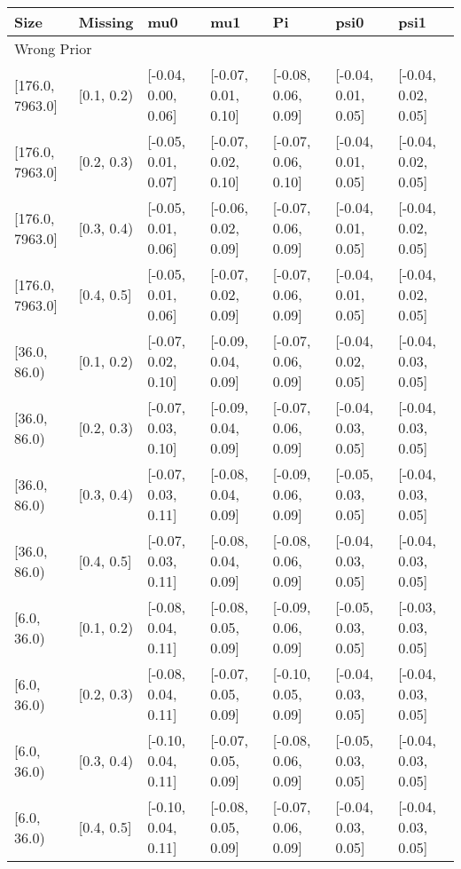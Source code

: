 \begin{table}[ht]
\centering
\begin{tabular}{lllllll}
  \toprule
Size & Missing & mu0 & mu1 & Pi & psi0 & psi1 \\ 
  \midrule
\multicolumn{7}{l}{Wrong Prior}\\
{[176.0, 7963.0]} & {[0.1, 0.2)} & {[-0.04, 0.00, 0.06]} & {[-0.07, 0.01, 0.10]} & {[-0.08, 0.06, 0.09]} & {[-0.04, 0.01, 0.05]} & {[-0.04, 0.02, 0.05]} \\ 
  {[176.0, 7963.0]} & {[0.2, 0.3)} & {[-0.05, 0.01, 0.07]} & {[-0.07, 0.02, 0.10]} & {[-0.07, 0.06, 0.10]} & {[-0.04, 0.01, 0.05]} & {[-0.04, 0.02, 0.05]} \\ 
  {[176.0, 7963.0]} & {[0.3, 0.4)} & {[-0.05, 0.01, 0.06]} & {[-0.06, 0.02, 0.09]} & {[-0.07, 0.06, 0.09]} & {[-0.04, 0.01, 0.05]} & {[-0.04, 0.02, 0.05]} \\ 
  {[176.0, 7963.0]} & {[0.4, 0.5]} & {[-0.05, 0.01, 0.06]} & {[-0.07, 0.02, 0.09]} & {[-0.07, 0.06, 0.09]} & {[-0.04, 0.01, 0.05]} & {[-0.04, 0.02, 0.05]} \\ 
  {[36.0, 86.0)} & {[0.1, 0.2)} & {[-0.07, 0.02, 0.10]} & {[-0.09, 0.04, 0.09]} & {[-0.07, 0.06, 0.09]} & {[-0.04, 0.02, 0.05]} & {[-0.04, 0.03, 0.05]} \\ 
  {[36.0, 86.0)} & {[0.2, 0.3)} & {[-0.07, 0.03, 0.10]} & {[-0.09, 0.04, 0.09]} & {[-0.07, 0.06, 0.09]} & {[-0.04, 0.03, 0.05]} & {[-0.04, 0.03, 0.05]} \\ 
  {[36.0, 86.0)} & {[0.3, 0.4)} & {[-0.07, 0.03, 0.11]} & {[-0.08, 0.04, 0.09]} & {[-0.09, 0.06, 0.09]} & {[-0.05, 0.03, 0.05]} & {[-0.04, 0.03, 0.05]} \\ 
  {[36.0, 86.0)} & {[0.4, 0.5]} & {[-0.07, 0.03, 0.11]} & {[-0.08, 0.04, 0.09]} & {[-0.08, 0.06, 0.09]} & {[-0.04, 0.03, 0.05]} & {[-0.04, 0.03, 0.05]} \\ 
  {[6.0, 36.0)} & {[0.1, 0.2)} & {[-0.08, 0.04, 0.11]} & {[-0.08, 0.05, 0.09]} & {[-0.09, 0.06, 0.09]} & {[-0.05, 0.03, 0.05]} & {[-0.03, 0.03, 0.05]} \\ 
  {[6.0, 36.0)} & {[0.2, 0.3)} & {[-0.08, 0.04, 0.11]} & {[-0.07, 0.05, 0.09]} & {[-0.10, 0.05, 0.09]} & {[-0.04, 0.03, 0.05]} & {[-0.04, 0.03, 0.05]} \\ 
  {[6.0, 36.0)} & {[0.3, 0.4)} & {[-0.10, 0.04, 0.11]} & {[-0.07, 0.05, 0.09]} & {[-0.08, 0.06, 0.09]} & {[-0.05, 0.03, 0.05]} & {[-0.04, 0.03, 0.05]} \\ 
  {[6.0, 36.0)} & {[0.4, 0.5]} & {[-0.10, 0.04, 0.11]} & {[-0.08, 0.05, 0.09]} & {[-0.07, 0.06, 0.09]} & {[-0.04, 0.03, 0.05]} & {[-0.04, 0.03, 0.05]} \\ 

\end{tabular}
\end{table}
